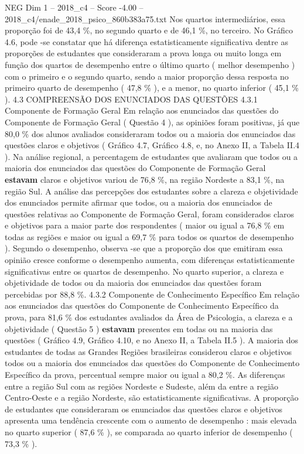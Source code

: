 \begin{textsample}{NEG Dim 1 – 2018\_c4 – Score -4.00 – 2018\_c4/enade\_2018\_psico\_860b383a75.txt}
Nos quartos intermediários, essa proporção foi de 43,4 \%, no segundo quarto e de 46,1 \%, no terceiro.
No Gráfico 4.6, pode -se constatar que há diferença estatisticamente significativa dentre as proporções de estudantes que consideraram a prova longa ou muito longa em função dos quartos de desempenho entre o último quarto ( melhor desempenho ) com o primeiro e o segundo quarto, sendo a maior proporção dessa resposta no primeiro quarto de desempenho ( 47,8 \% ), e a menor, no quarto inferior ( 45,1 \% ). 4.3 COMPREENSÃO DOS ENUNCIADOS DAS QUESTÕES 4.3.1 Componente de Formação Geral Em relação aos enunciados das questões do Componente de Formação Geral ( Questão 4 ), as opiniões foram positivas, já que 80,0 \% dos alunos avaliados consideraram todos ou a maioria dos enunciados das questões claros e objetivos ( Gráfico 4.7, Gráfico 4.8, e, no Anexo II, a Tabela II.4 ).
Na análise regional, a percentagem de estudantes que avaliaram que todos ou a maioria dos enunciados das questões do Componente de Formação Geral \textbf{estavam} claros e objetivos variou de 76,8 \%, na região Nordeste a 83,1 \%, na região Sul.
A análise das percepções dos estudantes sobre a clareza e objetividade dos enunciados permite afirmar que todos, ou a maioria dos enunciados de questões relativas ao Componente de Formação Geral, foram considerados claros e objetivos para a maior parte dos respondentes ( maior ou igual a 76,8 \% em todas as regiões e maior ou igual a 69,7 \% para todos os quartos de desempenho ).
Segundo o desempenho, observa -se que a proporção dos que emitiram essa opinião cresce conforme o desempenho aumenta, com diferenças estatisticamente significativas entre os quartos de desempenho.
No quarto superior, a clareza e objetividade de todos ou da maioria dos enunciados das questões foram percebidas por 88,8 \%. 4.3.2 Componente de Conhecimento Específico Em relação aos enunciados das questões do Componente de Conhecimento Específico da prova, para 81,6 \% dos estudantes avaliados da Área de Psicologia, a clareza e a objetividade ( Questão 5 ) \textbf{estavam} presentes em todas ou na maioria das questões ( Gráfico 4.9, Gráfico 4.10, e no Anexo II, a Tabela II.5 ).
A maioria dos estudantes de todas as Grandes Regiões brasileiras considerou claros e objetivos todos ou a maioria dos enunciados das questões do Componente de Conhecimento Específico da prova, percentual sempre maior ou igual a 80,2 \%.
As diferenças entre a região Sul com as regiões Nordeste e Sudeste, além da entre a região Centro-Oeste e a região Nordeste, são estatisticamente significativas.
A proporção de estudantes que consideraram os enunciados das questões claros e objetivos apresenta uma tendência crescente com o aumento de desempenho : mais elevada no quarto superior ( 87,6 \% ), se comparada ao quarto inferior de desempenho ( 73,3 \% ).

\end{textsample}
